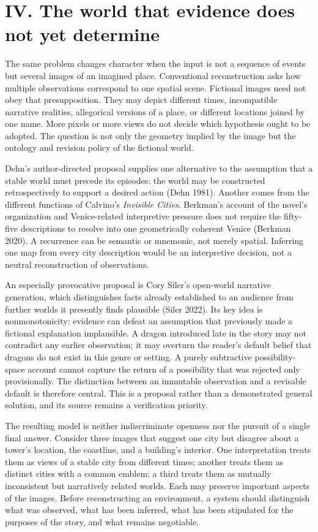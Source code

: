 \documentclass[
  11pt,
  letterpaper,
]{article}
\begin{document}
\section{IV. The world that evidence does not yet
determine}\label{iv.-the-world-that-evidence-does-not-yet-determine}

The same problem changes character when the input is not a sequence of
events but several images of an imagined place. Conventional
reconstruction asks how multiple observations correspond to one spatial
scene. Fictional images need not obey that presupposition. They may
depict different times, incompatible narrative realities, allegorical
versions of a place, or different locations joined by one name. More
pixels or more views do not decide which hypothesis ought to be adopted.
The question is not only the geometry implied by the image but the
ontology and revision policy of the fictional world.

Dehn's author-directed proposal supplies one alternative to the
assumption that a stable world must precede its episodes: the world may
be constructed retrospectively to support a desired action (Dehn 1981).
Another comes from the different functions of Calvino's \emph{Invisible
Cities}. Berkman's account of the novel's organization and
Venice-related interpretive pressure does not require the fifty-five
descriptions to resolve into one geometrically coherent Venice (Berkman
2020). A recurrence can be semantic or mnemonic, not merely spatial.
Inferring one map from every city description would be an interpretive
decision, not a neutral reconstruction of observations.

An especially provocative proposal is Cory Siler's open-world narrative
generation, which distinguishes facts already established to an audience
from further worlds it presently finds plausible (Siler 2022). Its key
idea is nonmonotonicity: evidence can defeat an assumption that
previously made a fictional explanation implausible. A dragon introduced
late in the story may not contradict any earlier observation; it may
overturn the reader's default belief that dragons do not exist in this
genre or setting. A purely subtractive possibility-space account cannot
capture the return of a possibility that was rejected only
provisionally. The distinction between an immutable observation and a
revisable default is therefore central. This is a proposal rather than a
demonstrated general solution, and its source remains a verification
priority.

The resulting model is neither indiscriminate openness nor the pursuit
of a single final answer. Consider three images that suggest one city
but disagree about a tower's location, the coastline, and a building's
interior. One interpretation treats them as views of a stable city from
different times; another treats them as distinct cities with a common
emblem; a third treats them as mutually inconsistent but narratively
related worlds. Each may preserve important aspects of the images.
Before reconstructing an environment, a system should distinguish what
was observed, what has been inferred, what has been stipulated for the
purposes of the story, and what remains negotiable.
\end{document}

